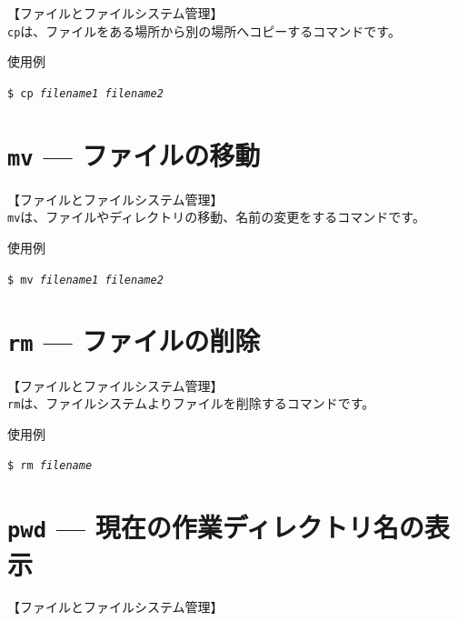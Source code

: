 \documentclass[a4j]{jreport}
\begin{document}
【ファイルとファイルシステム管理】\\

\texttt{cp}は、ファイルをある場所から別の場所へコピーするコマンドです。\\

\begin{itembox}[l]{使用例}
	\begin{alltt}\texttt{\$ cp \textit{filename1 filename2}}\end{alltt}
\end{itembox}

\section{\texttt{mv} --- ファイルの移動}

【ファイルとファイルシステム管理】\\

\texttt{mv}は、ファイルやディレクトリの移動、名前の変更をするコマンドです。\\

\begin{itembox}[l]{使用例}
	\begin{alltt}\texttt{\$ mv \textit{filename1 filename2}}\end{alltt}
\end{itembox}

\section{\texttt{rm} --- ファイルの削除}

【ファイルとファイルシステム管理】\\

\texttt{rm}は、ファイルシステムよりファイルを削除するコマンドです。\\

\begin{itembox}[l]{使用例}
	\begin{alltt}\texttt{\$ rm \textit{filename}}\end{alltt}
\end{itembox}

\section{\texttt{pwd} --- 現在の作業ディレクトリ名の表示}

【ファイルとファイルシステム管理】\\
\end{document}
